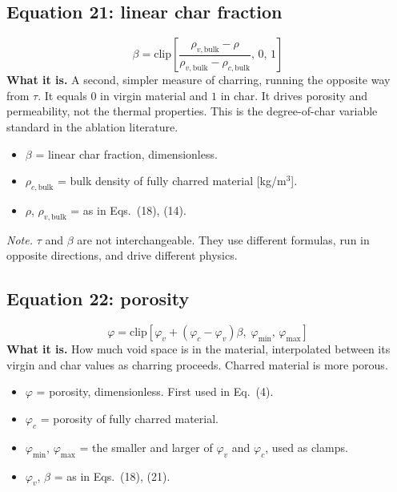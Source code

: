 \documentclass[11pt]{article}
\begin{document}
\subsection*{Equation 21: linear char fraction}
\begin{equation}
\beta = \mathrm{clip}\!\left[
\frac{\rho_{v,\mathrm{bulk}} - \rho}{\rho_{v,\mathrm{bulk}} - \rho_{c,\mathrm{bulk}}},\, 0,\, 1\right]
\end{equation}
\textbf{What it is.} A second, simpler measure of charring, running the opposite
way from $\tau$. It equals $0$ in virgin material and $1$ in char. It drives
porosity and permeability, not the thermal properties. This is the degree-of-char
variable standard in the ablation literature.
\begin{itemize}
  \item $\beta$ = linear char fraction, dimensionless.
  \item $\rho_{c,\mathrm{bulk}}$ = bulk density of fully charred material
        [kg/m$^3$].
  \item $\rho$, $\rho_{v,\mathrm{bulk}}$ = as in Eqs.~(18), (14).
\end{itemize}
\textit{Note.} $\tau$ and $\beta$ are not interchangeable. They use different
formulas, run in opposite directions, and drive different physics.

\subsection*{Equation 22: porosity}
\begin{equation}
\varphi = \mathrm{clip}\left[\varphi_v + (\varphi_c - \varphi_v)\beta,\;
\varphi_{\min},\, \varphi_{\max}\right]
\end{equation}
\textbf{What it is.} How much void space is in the material, interpolated between
its virgin and char values as charring proceeds. Charred material is more porous.
\begin{itemize}
  \item $\varphi$ = porosity, dimensionless. First used in Eq.~(4).
  \item $\varphi_c$ = porosity of fully charred material.
  \item $\varphi_{\min}$, $\varphi_{\max}$ = the smaller and larger of $\varphi_v$
        and $\varphi_c$, used as clamps.
  \item $\varphi_v$, $\beta$ = as in Eqs.~(18), (21).
\end{itemize}
\end{document}

